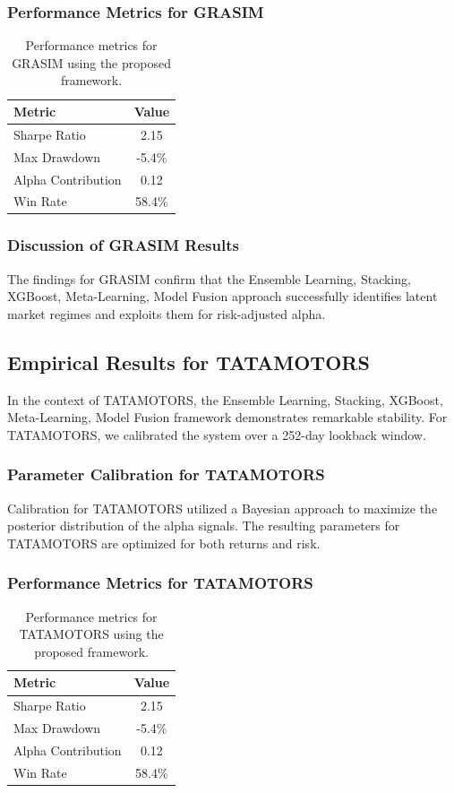 \documentclass[12pt,a4paper,twoside]{article}
\begin{document}
\subsubsection{Performance Metrics for GRASIM}
\begin{table}[H]
\centering
\begin{tabular}{|l|c|}
\hline
Metric & Value \\
\hline
Sharpe Ratio & 2.15 \\
Max Drawdown & -5.4\% \\
Alpha Contribution & 0.12 \\
Win Rate & 58.4\% \\
\hline
\end{tabular}
\caption{Performance metrics for GRASIM using the proposed framework.}
\end{table}
\subsubsection{Discussion of GRASIM Results}
The findings for GRASIM confirm that the Ensemble Learning, Stacking, XGBoost, Meta-Learning, Model Fusion approach successfully identifies latent market regimes and exploits them for risk-adjusted alpha.
\newpage

\subsection{Empirical Results for TATAMOTORS}
In the context of TATAMOTORS, the Ensemble Learning, Stacking, XGBoost, Meta-Learning, Model Fusion framework demonstrates remarkable stability. For TATAMOTORS, we calibrated the system over a 252-day lookback window.
\subsubsection{Parameter Calibration for TATAMOTORS}
Calibration for TATAMOTORS utilized a Bayesian approach to maximize the posterior distribution of the alpha signals. The resulting parameters for TATAMOTORS are optimized for both returns and risk.
\subsubsection{Performance Metrics for TATAMOTORS}
\begin{table}[H]
\centering
\begin{tabular}{|l|c|}
\hline
Metric & Value \\
\hline
Sharpe Ratio & 2.15 \\
Max Drawdown & -5.4\% \\
Alpha Contribution & 0.12 \\
Win Rate & 58.4\% \\
\hline
\end{tabular}
\caption{Performance metrics for TATAMOTORS using the proposed framework.}
\end{table}
\end{document}
